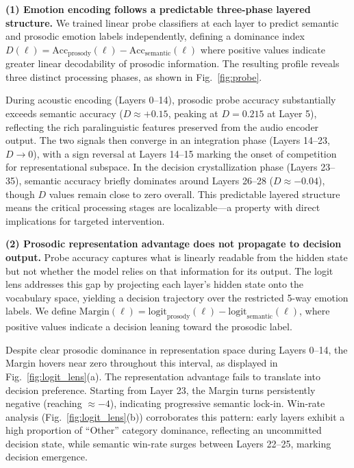 \textbf{(1) Emotion encoding follows a predictable three-phase layered structure.} We trained linear probe classifiers at each layer to predict semantic and prosodic emotion labels independently, defining a dominance index $D(\ell) = \text{Acc}_{\text{prosody}}(\ell) - \text{Acc}_{\text{semantic}}(\ell)$ where positive values indicate greater linear decodability of prosodic information. The resulting profile reveals three distinct processing phases, as shown in Fig.~\ref{fig:probe}.

During acoustic encoding (Layers 0--14), prosodic probe accuracy substantially exceeds semantic accuracy ($D \approx +0.15$, peaking at $D = 0.215$ at Layer 5), reflecting the rich paralinguistic features preserved from the audio encoder output. The two signals then converge in an integration phase (Layers 14--23, $D \to 0$), with a sign reversal at Layers 14--15 marking the onset of competition for representational subspace. In the decision crystallization phase (Layers 23--35), semantic accuracy briefly dominates around Layers 26--28 ($D \approx -0.04$), though $D$ values remain close to zero overall. This predictable layered structure means the critical processing stages are localizable---a property with direct implications for targeted intervention.

\textbf{(2) Prosodic representation advantage does not propagate to decision output.} Probe accuracy captures what is linearly readable from the hidden state but not whether the model relies on that information for its output. The logit lens addresses this gap by projecting each layer's hidden state onto the vocabulary space, yielding a decision trajectory over the restricted 5-way emotion labels. We define $\text{Margin}(\ell) = \text{logit}_{\text{prosody}}(\ell) - \text{logit}_{\text{semantic}}(\ell)$, where positive values indicate a decision leaning toward the prosodic label.

Despite clear prosodic dominance in representation space during Layers 0--14, the Margin hovers near zero throughout this interval, as displayed in Fig.~\ref{fig:logit_lens}(a). The representation advantage fails to translate into decision preference. Starting from Layer 23, the Margin turns persistently negative (reaching $\approx -4$), indicating progressive semantic lock-in. Win-rate analysis (Fig.~\ref{fig:logit_lens}(b)) corroborates this pattern: early layers exhibit a high proportion of ``Other'' category dominance, reflecting an uncommitted decision state, while semantic win-rate surges between Layers 22--25, marking decision emergence.

